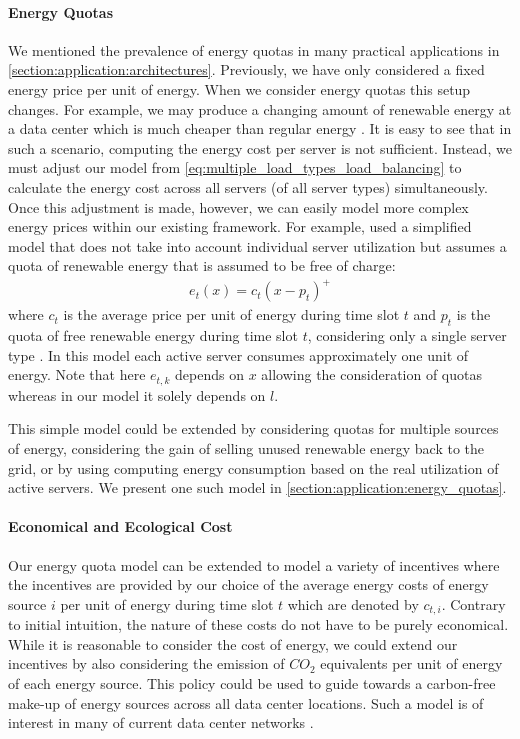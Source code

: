 \paragraph{Energy Quotas} We mentioned the prevalence of energy quotas in many practical applications in \autoref{section:application:architectures}. Previously, we have only considered a fixed energy price per unit of energy. When we consider energy quotas this setup changes. For example, we may produce a changing amount of renewable energy at a data center which is much cheaper than regular energy \cite{Lin2012}. It is easy to see that in such a scenario, computing the energy cost per server is not sufficient. Instead, we must adjust our model from \autoref{eq:multiple_load_types_load_balancing} to calculate the energy cost across all servers (of all server types) simultaneously. Once this adjustment is made, however, we can easily model more complex energy prices within our existing framework. For example, \citeauthor*{Lin2012} used a simplified model that does not take into account individual server utilization but assumes a quota of renewable energy that is assumed to be free of charge: \begin{align*}
    e_t(x) = c_{t}(x - p_t)^+
\end{align*} where $c_t$ is the average price per unit of energy during time slot $t$ and $p_t$ is the quota of free renewable energy during time slot $t$, considering only a single server type \cite{Lin2012}. In this model each active server consumes approximately one unit of energy. Note that here $e_{t,k}$ depends on $x$ allowing the consideration of quotas whereas in our model it solely depends on $l$.

This simple model could be extended by considering quotas for multiple sources of energy, considering the gain of selling unused renewable energy back to the grid, or by using computing energy consumption based on the real utilization of active servers. We present one such model in \autoref{section:application:energy_quotas}.

\paragraph{Economical and Ecological Cost} Our energy quota model can be extended to model a variety of incentives where the incentives are provided by our choice of the average energy costs of energy source $i$ per unit of energy during time slot $t$ which are denoted by $c_{t,i}$. Contrary to initial intuition, the nature of these costs do not have to be purely economical. While it is reasonable to consider the cost of energy, we could extend our incentives by also considering the emission of $CO_2$ equivalents per unit of energy of each energy source. This policy could be used to guide towards a carbon-free make-up of energy sources across all data center locations. Such a model is of interest in many of current data center networks \cite{Hölzle2020, Miller2021}.

